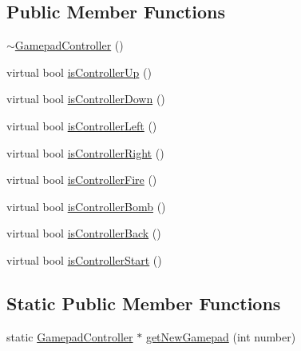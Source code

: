 \subsection*{Public Member Functions}
\begin{DoxyCompactItemize}
\item 
\hyperlink{class_gamepad_controller_af1c33038129ba047fed7541a4003d4a3}{$\sim$GamepadController} ()
\item 
virtual bool \hyperlink{class_gamepad_controller_a7654b6d043a2e7fb7420c87d1d7431bc}{isControllerUp} ()
\item 
virtual bool \hyperlink{class_gamepad_controller_ab64775ec0bf9239e45a05aab1f4724bc}{isControllerDown} ()
\item 
virtual bool \hyperlink{class_gamepad_controller_af7a4347ea33875e931cf7c5afca53780}{isControllerLeft} ()
\item 
virtual bool \hyperlink{class_gamepad_controller_ac5e39d22bb7db5a2e06d4886ce56a6e6}{isControllerRight} ()
\item 
virtual bool \hyperlink{class_gamepad_controller_a229821d3d8b9c792fb226bddfe9ea2af}{isControllerFire} ()
\item 
virtual bool \hyperlink{class_gamepad_controller_a24b688420baa64b45b80ddd981567b8d}{isControllerBomb} ()
\item 
virtual bool \hyperlink{class_gamepad_controller_a010033951bcaf5668eb26a18a0c2f56d}{isControllerBack} ()
\item 
virtual bool \hyperlink{class_gamepad_controller_ae89dfce3e5a5e4afe342ad69435f8367}{isControllerStart} ()
\end{DoxyCompactItemize}
\subsection*{Static Public Member Functions}
\begin{DoxyCompactItemize}
\item 
static \hyperlink{class_gamepad_controller}{GamepadController} $\ast$ \hyperlink{class_gamepad_controller_a81c336796d793e486d2ccf3db49a35c7}{getNewGamepad} (int number)
\end{DoxyCompactItemize}


